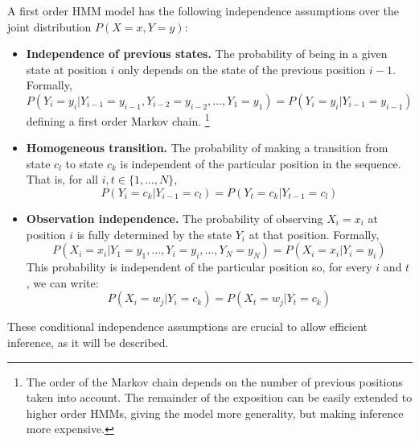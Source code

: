 A first order HMM model has the following independence assumptions over the joint distribution $P(X=x,Y=y)$:
\begin{itemize}
  \item \textbf{Independence of previous states.} The probability of
    being in a given state at position $i$ only depends on
    the state of the previous position $i-1$. Formally, 
    \begin{equation*}
    P (Y_i = y_i | Y_{i-1} = y_{i-1}, Y_{i-2} = y_{i-2}, \ldots, Y_1 = y_1) = P (Y_i = y_i | Y_{i-1} = y_{i-1})
    \end{equation*} 
    defining a first order Markov chain.%
    \footnote{The order of the Markov chain depends on the number of previous positions taken into account. 
    The remainder of the exposition can be easily extended to higher order HMMs, giving the model more generality, 
    but making inference more expensive.}
  \item \textbf{Homogeneous transition.} The probability of
    making a transition from state $c_l$ to state $c_k$ is independent of
    the particular position in the sequence. That is, for all $i,t \in \{1,\ldots,N\}$,
     \begin{equation*}
    P (Y_i = c_k | Y_{i-1} = c_l) =  P (Y_{t} = c_k | Y_{t-1} = c_l)
     \end{equation*}
  \item \textbf{Observation independence.}  The probability of
    observing $X_i = x_i$ at position $i$ is fully determined by the state $Y_i$
    at that position. Formally, 
     \begin{equation*}
     P (X_i = x_i | Y_1=y_1, \ldots, Y_i=y_i, \ldots, Y_N=y_N) = P(X_i = x_i | Y_i = y_i)
      \end{equation*}
      This probability is independent of the
    particular position so, for every $i$ and $t$, we can write:  
     \begin{equation*}
    P(X_i = w_j | Y_i = c_k) = P(X_{t} = w_j | Y_{t} = c_k)
     \end{equation*}
\end{itemize}
These conditional independence assumptions are crucial to allow
efficient inference, as it will be described.

